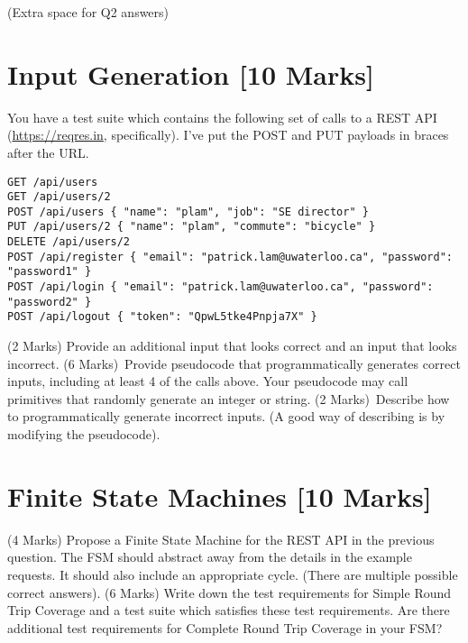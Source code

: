 \documentclass[12pt]{article}
\begin{document}
\newpage



(Extra space for Q2 answers)
\newpage
\section{Input Generation [10 Marks]}

You have a test suite which contains the following set of calls to a REST API (\url{https://reqres.in}, specifically).
I've put the POST and PUT payloads in braces after the URL.

\begin{lstlisting}
GET /api/users
GET /api/users/2
POST /api/users { "name": "plam", "job": "SE director" }
PUT /api/users/2 { "name": "plam", "commute": "bicycle" }
DELETE /api/users/2
POST /api/register { "email": "patrick.lam@uwaterloo.ca", "password": "password1" }
POST /api/login { "email": "patrick.lam@uwaterloo.ca", "password": "password2" }
POST /api/logout { "token": "QpwL5tke4Pnpja7X" }
\end{lstlisting}

(2 Marks) Provide an additional input that looks correct and an input that looks incorrect.
(6 Marks)~Provide pseudocode that programmatically generates correct inputs, including at least 4 of the calls above. Your pseudocode may call primitives that randomly generate an integer or string.
(2 Marks)~Describe how to programmatically generate incorrect inputs. (A good way of
describing is by modifying the pseudocode).

\newpage
\section{Finite State Machines [10 Marks]}
(4 Marks) Propose a Finite State Machine for the REST API in the previous question. The FSM should abstract away from the details in the
example requests. It should also include an appropriate cycle. (There are multiple possible correct answers). (6 Marks) Write down the test
requirements for Simple Round Trip Coverage and a test suite which satisfies these test requirements. Are there additional test
requirements for Complete Round Trip Coverage in your FSM?
\end{document}
